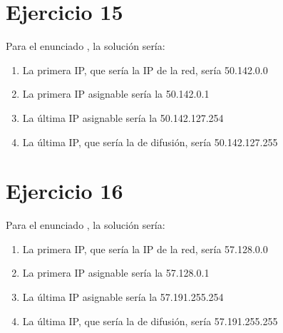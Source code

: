 \documentclass[letterpaper,10pt,spanish]{sphinxmanual}
\begin{document}
\section{Ejercicio 15}
\label{\detokenize{t2_integracion_elementos/ejercicios_subredes_ipv4/rangos_direcciones:id15}}
\sphinxAtStartPar
Para el enunciado , la solución sería:
\begin{enumerate}
%
\item {} 
\sphinxAtStartPar
La primera IP, que sería la IP de la red, sería 50.142.0.0

\item {} 
\sphinxAtStartPar
La primera IP asignable sería la 50.142.0.1

\item {} 
\sphinxAtStartPar
La última IP asignable sería la 50.142.127.254

\item {} 
\sphinxAtStartPar
La última IP, que sería la de difusión, sería 50.142.127.255

\end{enumerate}


\section{Ejercicio 16}
\label{\detokenize{t2_integracion_elementos/ejercicios_subredes_ipv4/rangos_direcciones:id16}}
\sphinxAtStartPar
Para el enunciado , la solución sería:
\begin{enumerate}
%
\item {} 
\sphinxAtStartPar
La primera IP, que sería la IP de la red, sería 57.128.0.0

\item {} 
\sphinxAtStartPar
La primera IP asignable sería la 57.128.0.1

\item {} 
\sphinxAtStartPar
La última IP asignable sería la 57.191.255.254

\item {} 
\sphinxAtStartPar
La última IP, que sería la de difusión, sería 57.191.255.255

\end{enumerate}
\end{document}
